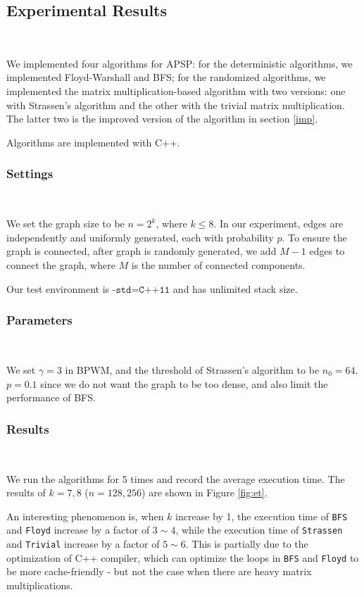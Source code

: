 \documentclass[11pt]{article}
\theoremstyle{plain}
\begin{document}
\subsection{Experimental Results}\

We implemented four algorithms for APSP: for the deterministic algorithms, we implemented Floyd-Warshall and BFS; for the randomized algorithms, we implemented the matrix multiplication-based algorithm with two versions: one with Strassen's algorithm and the other with the trivial matrix multiplication. The latter two is the improved version of the algorithm in section \ref{imp}.

Algorithms are implemented with C++.

\subsubsection{Settings}\

We set the graph size to be $n=2^k$, where $k\le 8$. In our experiment, edges are independently and uniformly generated, each with probability $p$. To ensure the graph is connected, after graph is randomly generated, we add $M-1$ edges to connect the graph, where $M$ is the number of connected components.

Our test environment is $\texttt{-std=C++11}$ and has unlimited stack size. 

\subsubsection{Parameters}\

We set $\gamma=3$ in BPWM, and the threshold of Strassen's algorithm to be $n_0=64$. $p=0.1$ since we do not want the graph to be too dense, and also limit the performance of BFS.

\subsubsection{Results}\

We run the algorithms for 5 times and record the average execution time. The results of $k=7,8$ ($n=128,256$) are shown in Figure \ref{fig:et}. 

An interesting phenomenon is, when $k$ increase by 1, the execution time of \texttt{BFS} and \texttt{Floyd} increase by a factor of $3\sim 4$, while the execution time of \texttt{Strassen} and \texttt{Trivial} increase by a factor of $5\sim 6$. This is partially due to the optimization of C++ compiler, which can optimize the loops in \texttt{BFS} and \texttt{Floyd} to be more cache-friendly - but not the case when there are heavy matrix multiplications.
\end{document}
